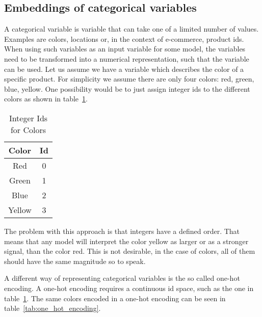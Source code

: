 \subsection{Embeddings of categorical variables}
A categorical variable is variable that can take one of a limited number of values.
Examples are colors, locations or, in the context of e-commerce, product ids.
When using such variables as an input variable for some model, the variables need to be transformed into a numerical representation, such that the variable can be used.
Let us assume we have a variable which describes the color of a specific product.
For simplicity we assume there are only four colors: red, green, blue, yellow.
One possibility would be to just assign integer ids to the different colors as shown in table~\ref{tab:id_encoding}.

\begin{table}[ht]
    \centering
    \begin{tabular}{c|c}
    Color & Id \\ \hline
    Red & 0 \\
    Green & 1 \\
    Blue & 2 \\
    Yellow & 3
    \end{tabular}
    \caption{Integer Ids for Colors}
    \label{tab:id_encoding}
\end{table}

The problem with this approach is that integers have a defined order.
That means that any model will interpret the color yellow as larger or as a stronger signal, than the color red.
This is not desirable, in the case of colors, all of them should have the same magnitude so to speak.
\par
A different way of representing categorical variables is the so called one-hot encoding.
A one-hot encoding requires a continuous id space, such as the one in table~\ref{tab:id_encoding}.
The same colors encoded in a one-hot encoding can be seen in table~\ref{tab:one_hot_encoding}.

